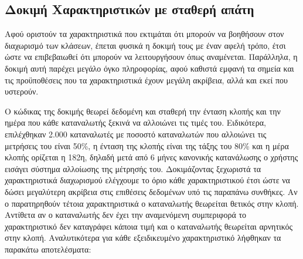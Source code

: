 \subsection{Δοκιμή Χαρακτηριστικών με σταθερή απάτη}
Αφού οριστούν τα χαρακτηριστικά που εκτιμάται ότι μπορούν να βοηθήσουν στον διαχωρισμό των κλάσεων, έπεται φυσικά η δοκιμή τους με έναν αφελή τρόπο, έτσι ώστε να επιβεβαιωθεί ότι μπορούν να λειτουργήσουν όπως αναμένεται. Παράλληλα, η δοκιμή αυτή παρέχει μεγάλο όγκο πληροφορίας, αφού καθιστά εμφανή τα σημεία και τις προϋποθέσεις που τα χαρακτηριστικά έχουν μεγάλη ακρίβεια, αλλά και εκεί που υστερούν.\par
Ο κώδικας της δοκιμής θεωρεί δεδομένη και σταθερή την ένταση κλοπής και την ημέρα που κάθε καταναλωτής ξεκινά να αλλοιώνει τις τιμές του. Ειδικότερα, επιλέχθηκαν 2.000 καταναλωτές με ποσοστό καταναλωτών που αλλοιώνει τις μετρήσεις του είναι 50\%, η ένταση της κλοπής είναι της τάξης του 80\% και η μέρα κλοπής ορίζεται η 182η, δηλαδή μετά από 6 μήνες κανονικής κατανάλωσης ο χρήστης εισάγει σύστημα αλλοίωσης της μέτρησής του. Δοκιμάζοντας ξεχωριστά τα χαρακτηριστικά διαχωρισμού ελέγχουμε το όριο κάθε χαρακτηριστικού έτσι ώστε να δώσει μεγαλύτερη ακρίβεια στις επιθέσεις δεδομένων υπό τις παραπάνω συνθήκες. Αν ο παρατηρηθούν τέτοια χαρακτηριστικά ο καταναλωτής θεωρείται θετικός στην κλοπή. Αντίθετα αν ο καταναλωτής δεν έχει την αναμενόμενη συμπεριφορά το χαρακτηριστικό δεν καταγράφει κάποια τιμή και ο καταναλωτής θεωρείται αρνητικός στην κλοπή. Αναλυτικότερα για κάθε εξειδικευμένο χαρακτηριστικό λήφθηκαν τα παρακάτω αποτελέσματα:
